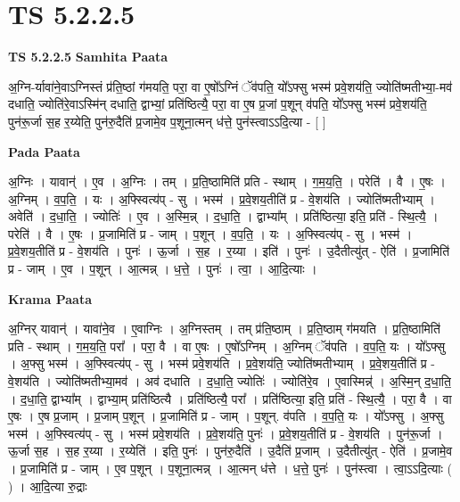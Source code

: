 \documentclass[17pt]{extarticle}
\begin{document}
\section{ TS 5.2.2.5 }

\textbf{TS 5.2.2.5 } \newline
\textbf{Samhita Paata} \newline

अ॒ग्नि-र्यावा॑ने॒वाऽग्निस्तं प्र॑ति॒ष्ठां ग॑मयति॒ परा॒ वा ए॒षो᳚ऽग्निं ॅव॑पति॒ यो᳚ऽफ्सु भस्म॑ प्रवे॒शय॑ति॒ ज्योति॑ष्मतीभ्या॒-मव॑ दधाति॒ ज्योति॑रे॒वाऽस्मि॑न् दधाति॒ द्वाभ्यां॒ प्रति॑ष्ठित्यै॒ परा॒ वा ए॒ष प्र॒जां प॒शून् व॑पति॒ यो᳚ऽफ्सु भस्म॑ प्रवे॒शय॑ति॒ पुन॑रू॒र्जा स॒ह र॒य्येति॒ पुन॑रु॒दैति॑ प्र॒जामे॒व प॒शूना॒त्मन् ध॑त्ते॒ पुन॑स्त्वाऽऽदि॒त्या - [  ] \newline

\textbf{Pada Paata} \newline

अ॒ग्निः । यावान्॑ । ए॒व । अ॒ग्निः । तम् । प्र॒ति॒ष्ठामिति॑ प्रति - स्थाम् । ग॒म॒य॒ति॒ । परेति॑ । वै । ए॒षः । अ॒ग्निम् । व॒प॒ति॒ । यः । अ॒फ्स्वित्य॑प् - सु । भस्म॑ । प्र॒वे॒शय॒तीति॑ प्र - वे॒शय॑ति । ज्योति॑ष्मतीभ्याम् । अवेति॑ । द॒धा॒ति॒ । ज्योतिः॑ । ए॒व । अ॒स्मि॒न्न् । द॒धा॒ति॒ । द्वाभ्या᳚म् । प्रति॑ष्ठित्या॒ इति॒ प्रति॑ - स्थि॒त्यै॒ । परेति॑ । वै । ए॒षः । प्र॒जामिति॑ प्र - जाम् । प॒शून् । व॒प॒ति॒ । यः । अ॒फ्स्वित्य॑प् - सु । भस्म॑ । प्र॒वे॒शय॒तीति॑ प्र - वे॒शय॑ति । पुनः॑ । ऊ॒र्जा । स॒ह । र॒य्या । इति॑ । पुनः॑ । उ॒दैतीत्यु॑त् - ऐति॑ । प्र॒जामिति॑ प्र - जाम् । ए॒व । प॒शून् । आ॒त्मन्न् । ध॒त्ते॒ । पुनः॑ । त्वा॒ । आ॒दि॒त्याः ।  \newline


\textbf{Krama Paata} \newline

अ॒ग्निर् यावान्॑ । यावा॑ने॒व । ए॒वाग्निः । अ॒ग्निस्तम् । तम् प्र॑ति॒ष्ठाम् । प्र॒ति॒ष्ठाम् ग॑मयति । प्र॒ति॒ष्ठामिति॑ प्रति - स्थाम् । ग॒म॒य॒ति॒ परा᳚ । परा॒ वै । वा ए॒षः । ए॒षो᳚ऽग्निम् । अ॒ग्निम् ॅव॑पति । व॒प॒ति॒ यः । यो᳚ऽफ्सु । अ॒फ्सु भस्म॑ । अ॒फ्स्वित्य॑प् - सु । भस्म॑ प्रवे॒शय॑ति । प्र॒वे॒शय॑ति॒ ज्योति॑ष्मतीभ्याम् । प्र॒वे॒शय॒तीति॑ प्र - वे॒शय॑ति । ज्योति॑ष्मतीभ्या॒मव॑ । अव॑ दधाति । द॒धा॒ति॒ ज्योतिः॑ । ज्योति॑रे॒व । ए॒वास्मिन्न्॑ । अ॒स्मि॒न् द॒धा॒ति॒ । द॒धा॒ति॒ द्वाभ्या᳚म् । द्वाभ्या॒म् प्रति॑ष्ठित्यै । प्रति॑ष्ठित्यै॒ परा᳚ । प्रति॑ष्ठित्या॒ इति॒ प्रति॑ - स्थि॒त्यै॒ । परा॒ वै । वा ए॒षः । ए॒ष प्र॒जाम् । प्र॒जाम् प॒शून् । प्र॒जामिति॑ प्र - जाम् । प॒शून्. व॑पति । व॒प॒ति॒ यः । यो᳚ऽफ्सु । अ॒फ्सु भस्म॑ । अ॒फ्स्वित्य॑प् - सु । भस्म॑ प्रवे॒शय॑ति । प्र॒वे॒शय॑ति॒ पुनः॑ । प्र॒वे॒शय॒तीति॑ प्र - वे॒शय॑ति । पुन॑रू॒र्जा । ऊ॒र्जा स॒ह । स॒ह र॒य्या । र॒य्येति॑ । इति॒ पुनः॑ । पुन॑रु॒दैति॑ । उ॒दैति॑ प्र॒जाम् । उ॒दैतीत्यु॑त् - ऐति॑ । प्र॒जामे॒व । प्र॒जामिति॑ प्र - जाम् । ए॒व प॒शून् । प॒शूना॒त्मन्न् । आ॒त्मन् ध॑त्ते । ध॒त्ते॒ पुनः॑ । पुन॑स्त्वा । त्वा॒ऽऽदि॒त्याः ( ) । आ॒दि॒त्या रु॒द्राः \newline
\end{document}
